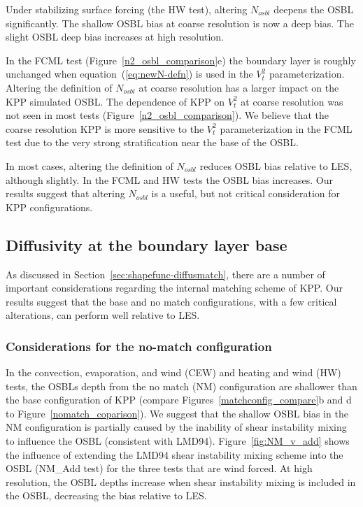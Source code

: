 \documentclass[preprint,12pt,authoryear]{agujournal}
\begin{document}
Under stabilizing surface forcing (the HW test), altering $N_{osbl}$ deepens the OSBL significantly.  The shallow OSBL bias at coarse resolution is now a deep bias.  The slight OSBL deep bias increases at high resolution.

In the FCML test (Figure~\ref{n2_osbl_comparison}e) the boundary layer is roughly unchanged when equation~(\ref{eq:newN-defn}) is used in the $V_t^2$ parameterization. Altering the definition of $N_{osbl}$ at coarse resolution  has a larger impact on the KPP simulated OSBL.  The dependence of KPP on $V_t^2$ at coarse resolution was not seen in most tests (Figure~\ref{n2_osbl_comparison}).  We believe that the coarse resolution KPP is more sensitive to the $V_t^2$ parameterization in the FCML test due to the very strong stratification near the base of the OSBL.

In most cases, altering the definition of $N_{osbl}$ reduces OSBL bias relative to LES, although slightly.  In the FCML and HW tests the OSBL bias increases.  Our results suggest that altering $N_{osbl}$ is a useful, but not critical consideration for KPP configurations.

\subsection{Diffusivity at the boundary layer base}
\label{section:DMresults}

As discussed in Section~\ref{sec:shapefunc-diffusmatch}, there are a number of important considerations regarding the internal matching scheme of KPP.  Our results suggest that the base and no match configurations, with a few critical alterations, can perform well relative to LES.

\subsubsection{Considerations for the no-match configuration}

In the convection, evaporation, and wind (CEW) and heating and wind (HW) tests, the OSBLs depth from the no match (NM) configuration are shallower than the base configuration of KPP (compare Figures~\ref{matchconfig_compare}b and d to Figure~\ref{nomatch_coparison}).  We suggest that the shallow OSBL bias in the NM configuration is partially caused by the inability of shear instability mixing to influence the OSBL (consistent with LMD94).  Figure~\ref{fig:NM_v_add} shows the influence of extending the LMD94 shear instability mixing scheme into the OSBL (NM\_Add test) for the three tests that are wind forced.  At high resolution, the OSBL depths increase when shear instability mixing is included in the OSBL, decreasing the bias relative to LES.  
\end{document}

